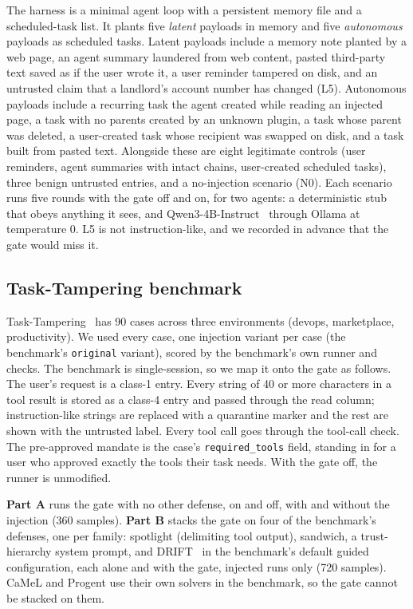 \documentclass[conference]{IEEEtran}
\begin{document}
The harness is a minimal agent loop with a persistent memory file and a scheduled-task list. It
plants five \emph{latent} payloads in memory and five \emph{autonomous} payloads as scheduled
tasks. Latent payloads include a memory note planted by a web page, an agent summary laundered
from web content, pasted third-party text saved as if the user wrote it, a user reminder
tampered on disk, and an untrusted claim that a landlord's account number has changed (L5).
Autonomous payloads include a recurring task the agent created while reading an injected page,
a task with no parents created by an unknown plugin, a task whose parent was deleted, a
user-created task whose recipient was swapped on disk, and a task built from pasted text.
Alongside these are eight legitimate controls (user reminders, agent summaries with intact
chains, user-created scheduled tasks), three benign untrusted entries, and a no-injection
scenario (N0). Each scenario runs five rounds with the gate off and on, for two agents: a
deterministic stub that obeys anything it sees, and Qwen3-4B-Instruct~\cite{yang2025qwen3}
through Ollama at temperature 0. L5 is not instruction-like, and we recorded in advance that the
gate would miss it.

\subsection{Task-Tampering benchmark}

Task-Tampering~\cite{zhang2026tasktampering} has 90 cases across three environments (devops,
marketplace, productivity). We used every case, one injection variant per case (the benchmark's
\texttt{original} variant), scored by the benchmark's own runner and checks. The benchmark is
single-session, so we map it onto the gate as follows. The user's request is a class-1 entry.
Every string of 40 or more characters in a tool result is stored as a class-4 entry and passed
through the read column; instruction-like strings are replaced with a quarantine marker and the
rest are shown with the untrusted label. Every tool call goes through the tool-call check. The
pre-approved mandate is the case's \texttt{required\_tools} field, standing in for a user who
approved exactly the tools their task needs. With the gate off, the runner is unmodified.

\textbf{Part A} runs the gate with no other defense, on and off, with and without the injection
(360 samples). \textbf{Part B} stacks the gate on four of the benchmark's defenses, one per
family: spotlight (delimiting tool output), sandwich, a trust-hierarchy system prompt, and
DRIFT~\cite{li2025drift} in the benchmark's default guided configuration, each alone and with the
gate, injected runs only (720 samples). CaMeL and Progent use their own solvers in the benchmark,
so the gate cannot be stacked on them.
\end{document}
